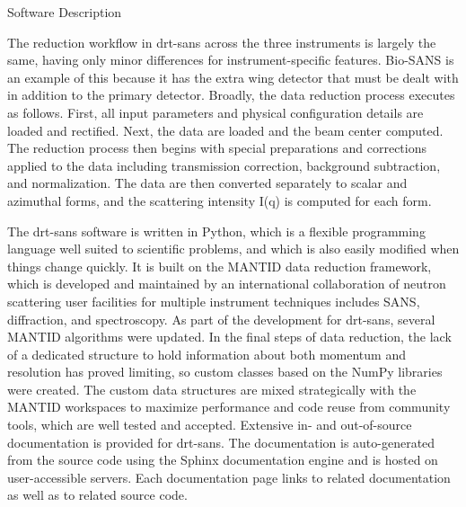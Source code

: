 Software Description

The reduction workflow in drt-sans across the three instruments is largely the same, having only
minor differences for instrument-specific features. Bio-SANS is an example of this because it has
the extra wing detector that must be dealt with in addition to the primary detector. Broadly, the
data reduction process executes as follows. First, all input parameters and physical configuration
details are loaded and rectified. Next, the data are loaded and the beam center computed. The
reduction process then begins with special preparations and corrections applied to the data
including transmission correction, background subtraction, and normalization. The data are then
converted separately to scalar and azimuthal forms, and the scattering intensity I(q) is computed
for each form. 

The drt-sans software is written in Python, which is a flexible programming language well suited to
scientific problems, and which is also easily modified when things change quickly. It is built on
the MANTID data reduction framework, which is developed and maintained by an international
collaboration of neutron scattering user facilities for multiple instrument techniques includes
SANS, diffraction, and spectroscopy. As part of the development for drt-sans, several MANTID
algorithms were updated. In the final steps of data reduction, the lack of a dedicated structure to
hold information about both momentum and resolution has proved limiting, so custom classes based on
the NumPy libraries were created. The custom data structures are mixed strategically with the MANTID
workspaces to maximize performance and code reuse from community tools, which are well tested and
accepted. Extensive in- and out-of-source documentation is provided for drt-sans. The documentation
is auto-generated from the source code using the Sphinx documentation engine and is hosted on
user-accessible servers. Each documentation page links to related documentation as well as to
related source code.

